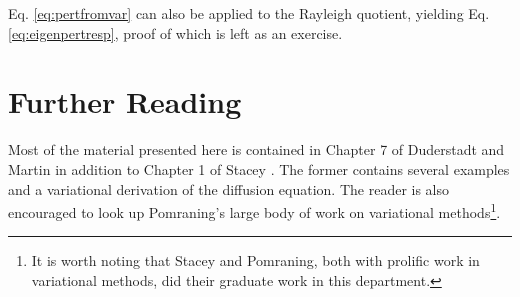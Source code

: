 Eq. \ref{eq:pertfromvar} can also be applied to the Rayleigh quotient, 
yielding Eq. \ref{eq:eigenpertresp}, proof of which is left 
as an exercise.

\section*{Further Reading}

Most of the material presented here is contained in Chapter 7 of 
Duderstadt and Martin \cite{duderstadt1976tt}  in addition to Chapter 1 
of Stacey \cite{stacey1974vmn}.  The former contains several examples 
and a variational derivation of the diffusion equation.  The reader is 
also encouraged to look up Pomraning's large body of work on variational 
methods\footnote{It is worth noting that Stacey and Pomraning, both with 
prolific work in variational methods, did their graduate work in 
this department.}.

